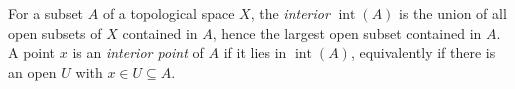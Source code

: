 
For a subset $A$ of a topological space $X$, the \emph{interior} $\operatorname{int}(A)$ is the union of all open subsets of $X$ contained in $A$, hence the largest open subset contained in $A$. A point $x$ is an \emph{interior point} of $A$ if it lies in $\operatorname{int}(A)$, equivalently if there is an open $U$ with $x\in U\subseteq A$.
